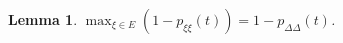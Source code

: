 \documentclass{article}
\newtheorem{lemma}{Lemma}
\newcommand{\1}[1]{\mathbb{I}_{#1}}
\begin{document}
\begin{lemma}\label{thm:maximum_pr}
$\max_{\xi\in E} (1 - p_{\xi\xi}(t)) = 1 - p_{\Delta\Delta}(t)$.
\end{lemma}
\end{document}
